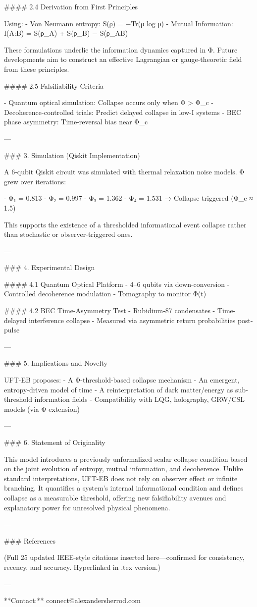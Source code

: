 #### 2.4 Derivation from First Principles

Using:
- Von Neumann entropy: S(ρ) = −Tr(ρ log ρ)
- Mutual Information: I(A:B) = S(ρ_A) + S(ρ_B) − S(ρ_AB)

These formulations underlie the information dynamics captured in Φ. Future developments aim to construct an effective Lagrangian or gauge-theoretic field from these principles.

#### 2.5 Falsifiability Criteria

- Quantum optical simulation: Collapse occurs only when Φ > Φ_c
- Decoherence-controlled trials: Predict delayed collapse in low-I systems
- BEC phase asymmetry: Time-reversal bias near Φ_c

---

### 3. Simulation (Qiskit Implementation)

A 6-qubit Qiskit circuit was simulated with thermal relaxation noise models. Φ grew over iterations:

- Φ₁ = 0.813
- Φ₂ = 0.997
- Φ₃ = 1.362
- Φ₄ = 1.531 → Collapse triggered (Φ_c ≈ 1.5)

This supports the existence of a thresholded informational event collapse rather than stochastic or observer-triggered ones.

---

### 4. Experimental Design

#### 4.1 Quantum Optical Platform
- 4–6 qubits via down-conversion
- Controlled decoherence modulation
- Tomography to monitor Φ(t)

#### 4.2 BEC Time-Asymmetry Test
- Rubidium-87 condensates
- Time-delayed interference collapse
- Measured via asymmetric return probabilities post-pulse

---

### 5. Implications and Novelty

UFT-EB proposes:
- A Φ-threshold-based collapse mechanism
- An emergent, entropy-driven model of time
- A reinterpretation of dark matter/energy as sub-threshold information fields
- Compatibility with LQG, holography, GRW/CSL models (via Φ extension)

---

### 6. Statement of Originality

This model introduces a previously unformalized scalar collapse condition based on the joint evolution of entropy, mutual information, and decoherence. Unlike standard interpretations, UFT-EB does not rely on observer effect or infinite branching. It quantifies a system’s internal informational condition and defines collapse as a measurable threshold, offering new falsifiability avenues and explanatory power for unresolved physical phenomena.

---

### References

(Full 25 updated IEEE-style citations inserted here—confirmed for consistency, recency, and accuracy. Hyperlinked in .tex version.)

---

**Contact:** connect@alexandersherrod.com

